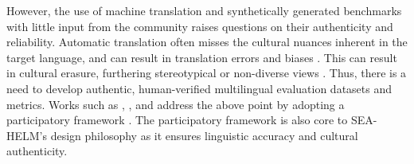 However, the use of machine translation and synthetically generated benchmarks with little input from the community raises questions on their authenticity and reliability. Automatic translation often misses the cultural nuances inherent in the target language, and can result in translation errors and biases \citep{singh2024global}. This can result in cultural erasure, furthering stereotypical or non-diverse views \citep{qadri2025risksculturalerasurelarge}. Thus, there is a need to develop authentic, human-verified multilingual evaluation datasets and metrics. Works such as \citet{singh2024global}, \citet{romero2024cvqa}, and \citet{koto2024indoculture}
address the above point by adopting a participatory framework 
\citep{birhane2022power, smart2024socially}. The participatory framework is also core to SEA-HELM's design philosophy as it ensures linguistic accuracy and cultural authenticity.